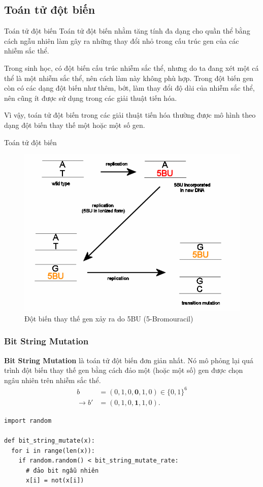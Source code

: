 
\subsection{Toán tử đột biến} %
\label{sub:Toán tử đột biến}

\begin{frame}{Toán tử đột biến}
Toán tử đột biến nhằm tăng tính đa dạng cho quần thể bằng cách ngẫu nhiên làm
gây ra những thay đổi nhỏ trong cấu trúc gen của các nhiễm sắc thể.

Trong sinh học, có đột biến cấu trúc nhiễm sắc thể, nhưng do ta đang xét một cá
thể là một nhiễm sắc thể, nên cách làm này không phù hợp. Trong đột biến gen còn
có các dạng đột biến như thêm, bớt, làm thay đổi độ dài của nhiễm sắc thể, nên
cũng ít được sử dụng trong các giải thuật tiến hóa.

Vì vậy, toán tử đột biến trong các giải thuật tiến hóa thường được mô hình theo
dạng đột biến thay thế một hoặc một số gen.

\end{frame}
\begin{frame}{Toán tử đột biến}
\begin{figure}
  \centering
  \includegraphics[width=.8\textwidth,height=0.7\textheight,keepaspectratio]
  {res/5bu.png}
  \caption{Đột biến thay thế gen xảy ra do 5BU (5-Bromouracil)}
\end{figure}
\end{frame}

\begin{frame}[fragile]
\frametitle{Bit String Mutation}
  \textbf{Bit String Mutation} là toán tử đột biến đơn giản nhất. Nó mô phỏng
  lại quá trình đột biến thay thế gen bằng cách đảo một (hoặc một số) gen
  được chọn ngâu nhiên trên nhiễm sắc thể.
  \begin{align*}
    b &= (0, 1, 0, \mathbf{0}, 1, 0) \in \{0, 1\} ^{6}\\
    \to b' &= (0, 1, 0, \mathbf{1}, 1, 0)
  .\end{align*}

  \begin{verbatim}
import random

def bit_string_mutate(x):
  for i in range(len(x)):
    if random.random() < bit_string_mutate_rate:
      # đảo bit ngẫu nhiên
      x[i] = not(x[i])
  \end{verbatim}
\end{frame}

